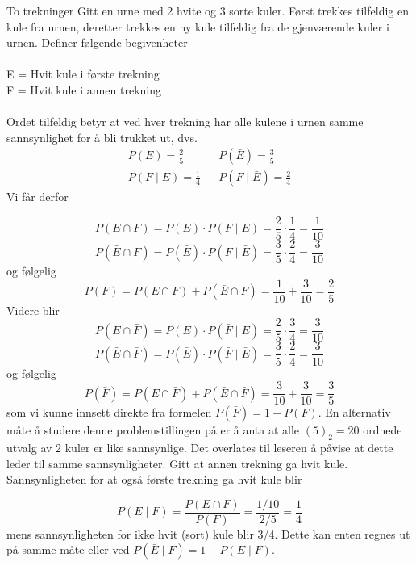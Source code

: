 \begin{eksempel}{To trekninger}
Gitt en urne med 2 hvite og 3 sorte kuler. Først trekkes
tilfeldig en kule fra urnen, deretter trekkes en ny kule
tilfeldig fra de gjenværende kuler i urnen. Definer følgende
begivenheter \\ \\
\indent     E = Hvit kule i første trekning \\
\indent     F = Hvit kule i annen trekning \\ \\
\noindent Ordet tilfeldig betyr at ved hver trekning har alle kulene i
urnen samme sannsynlighet for å bli trukket ut, dvs.
 \begin{eqnarray*} 
P(E)=\frac{2}{5}&&P(\bar{E})=\frac{3}{5} \\
P(F \mid E)=\frac{1}{4}&& P(F \mid \bar{E})=\frac{2}{4}
\end{eqnarray*}
\noindent Vi får derfor

\[ P(E \cap F)=P(E) \cdot P(F \mid E)= 
                         \frac{2}{5} \cdot \frac{1}{4}=\frac{1}{10} \]
\[ P(\bar{E} \cap F)=P(\bar{E}) \cdot P(F \mid \bar{E})= 
                         \frac{3}{5} \cdot \frac{2}{4}=\frac{3}{10} \]
og følgelig
\[ P(F)=P(E \cap F) + P(\bar{E} \cap F)= 
                         \frac{1}{10} + \frac{3}{10}=\frac{2}{5} \]
\noindent Videre blir
\[ P(E \cap \bar{F})=P(E) \cdot P(\bar{F} \mid E)= 
                         \frac{2}{5} \cdot \frac{3}{4}=\frac{3}{10} \]
\[ P(\bar{E} \cap \bar{F})=P(\bar{E}) \cdot P(\bar{F} \mid \bar{E})= 
                         \frac{3}{5} \cdot \frac{2}{4}=\frac{3}{10} \]
og følgelig
\[ P(\bar{F})=P(E \cap \bar{F}) + P(\bar{E} \cap \bar{F})= 
                         \frac{3}{10} + \frac{3}{10}=\frac{3}{5} \]
som vi kunne innsett direkte fra formelen $P(\bar{F})=1-P(F)$. En
alternativ måte å studere denne problemstillingen på er å
anta at alle $(5)_2=20$ ordnede utvalg av 2 kuler er like sannsynlige.
Det overlates til leseren å påvise at dette leder til samme
sannsynligheter. Gitt at annen trekning ga hvit kule.
Sannsynligheten for at også første trekning ga hvit kule blir

\[ P(E \mid F)=\frac{P(E \cap F)}{P(F)}=\frac{1/10}{2/5}=\frac{1}{4} \]
mens sannsynligheten for ikke hvit (sort) kule blir 3/4. Dette
kan enten regnes ut på samme måte eller ved
 $P(\bar{E} \mid F)=1-P(E \mid F)$.
\end{eksempel}


